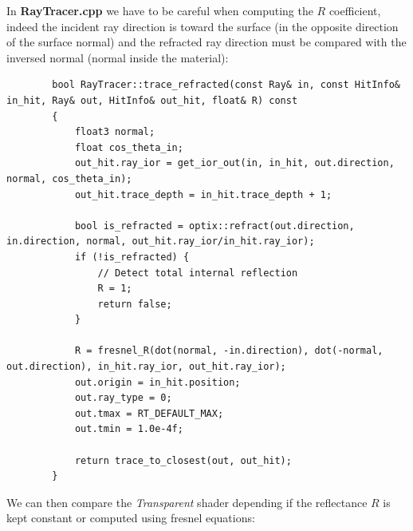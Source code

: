 \documentclass[a4,12pt]{article}
\begin{document}
	In \textbf{RayTracer.cpp} we have to be careful when computing the $R$ coefficient, indeed the incident ray direction is toward the surface (in the opposite direction of the surface normal) and the refracted ray direction must be compared with the inversed normal (normal inside the material):
	\begin{lstlisting}
		bool RayTracer::trace_refracted(const Ray& in, const HitInfo& in_hit, Ray& out, HitInfo& out_hit, float& R) const
		{
			float3 normal;
			float cos_theta_in;
			out_hit.ray_ior = get_ior_out(in, in_hit, out.direction, normal, cos_theta_in);
			out_hit.trace_depth = in_hit.trace_depth + 1;
			
			bool is_refracted = optix::refract(out.direction, in.direction, normal, out_hit.ray_ior/in_hit.ray_ior);
			if (!is_refracted) {
				// Detect total internal reflection
				R = 1;
				return false;
			}
			
			R = fresnel_R(dot(normal, -in.direction), dot(-normal, out.direction), in_hit.ray_ior, out_hit.ray_ior);
			out.origin = in_hit.position;
			out.ray_type = 0;
			out.tmax = RT_DEFAULT_MAX;
			out.tmin = 1.0e-4f;
			
			return trace_to_closest(out, out_hit);
		}
	\end{lstlisting}
	
	We can then compare the \textit{Transparent} shader depending if the reflectance $R$ is kept constant or computed using fresnel equations:
	
\end{document}
